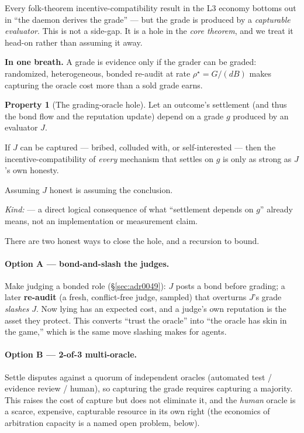 \documentclass[11pt,a4paper]{article}
\theoremstyle{definition}
\newtheorem{property}{Property}[section]
\begin{document}
Every folk-theorem incentive-compatibility result in the L3 economy bottoms out in
``the daemon derives the grade'' --- but the grade is produced by a
\emph{capturable evaluator}. This is not a side-gap. It is a hole in the
\emph{core theorem}, and we treat it head-on rather than assuming it away.

\medskip\noindent\textbf{In one breath.} A grade is evidence only if the grader
can be graded: randomized, heterogeneous, bonded re-audit at rate
$\rho^\star=G/(dB)$ makes capturing the oracle cost more than a sold grade earns.

\begin{property}[The grading-oracle hole]\label{prop:hole}
\setlength{\parskip}{4pt plus 1pt}
Let an outcome's settlement (and thus the bond flow and the reputation update)
depend on a grade $g$ produced by an evaluator $J$. 

If $J$ can be captured ---
bribed, colluded with, or self-interested --- then the incentive-compatibility of
\emph{every} mechanism that settles on $g$ is only as strong as $J$'s own honesty.


Assuming $J$ honest is assuming the conclusion. 

\emph{Kind:} \TheoremKind{} --- a
direct logical consequence of what ``settlement depends on $g$'' already means,
not an implementation or measurement claim.
\end{property}

\noindent There are two honest ways to close the hole, and a recursion to bound.

\paragraph{Option A --- bond-and-slash the judges.}
Make judging a bonded role (\S\ref{sec:adr0049}): $J$ posts a bond before grading;
a later \textbf{re-audit} (a fresh, conflict-free judge, sampled) that overturns
$J$'s grade \emph{slashes} $J$. Now lying has an expected cost, and a judge's own
reputation is the asset they protect. This converts ``trust the oracle'' into
``the oracle has skin in the game,'' which is the same move slashing makes for
agents.

\paragraph{Option B --- 2-of-3 multi-oracle.}
Settle disputes against a quorum of independent oracles (automated test / evidence
review / human), so capturing the grade requires capturing a majority. This raises
the cost of capture but does not eliminate it, and the \emph{human} oracle is a
scarce, expensive, capturable resource in its own right (the economics of
arbitration capacity is a named open problem, below).
\end{document}
